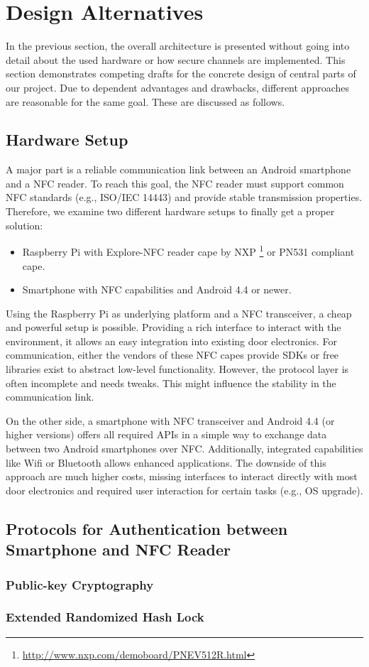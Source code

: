 \section{Design Alternatives}\label{sec:alt}
In the previous section, the overall architecture is presented without going into detail about the used hardware or how secure channels are implemented.
This section demonstrates competing drafts for the concrete design of central parts of our project. 
Due to dependent advantages and drawbacks, different approaches are reasonable for the same goal. These are discussed as follows.

\subsection{Hardware Setup}
A major part is a reliable communication link between an Android smartphone and a NFC reader.
To reach this goal, the NFC reader must support common NFC standards (e.g., ISO/IEC 14443) and provide stable transmission properties.
Therefore, we examine two different hardware setups to finally get a proper solution:
%
\begin{itemize}
	\item Raspberry Pi with Explore-NFC reader cape by NXP \footnote{\url{http://www.nxp.com/demoboard/PNEV512R.html}} or PN531 compliant cape.
	\item Smartphone with NFC capabilities and Android 4.4 or newer.
\end{itemize}
%
Using the Raspberry Pi as underlying platform and a NFC transceiver, a cheap and powerful setup is possible.
Providing a rich interface to interact with the environment, it allows an easy integration into existing door electronics.
For communication, either the vendors of these NFC capes provide SDKs or free libraries exist to abstract low-level functionality. 
However, the protocol layer is often incomplete and needs tweaks. This might influence the stability in the communication link.

On the other side, a smartphone with NFC transceiver and Android 4.4 (or higher versions) offers all required APIs in a simple way to exchange data between two Android smartphones over NFC.
Additionally, integrated capabilities like Wifi or Bluetooth allows enhanced applications. The downside of this approach are much higher costs, missing interfaces to interact directly with most door electronics and required user interaction for certain tasks (e.g., OS upgrade).


\subsection{Protocols for Authentication between Smartphone and NFC Reader}

\subsubsection{Public-key Cryptography}

\subsubsection{Extended Randomized Hash Lock}
